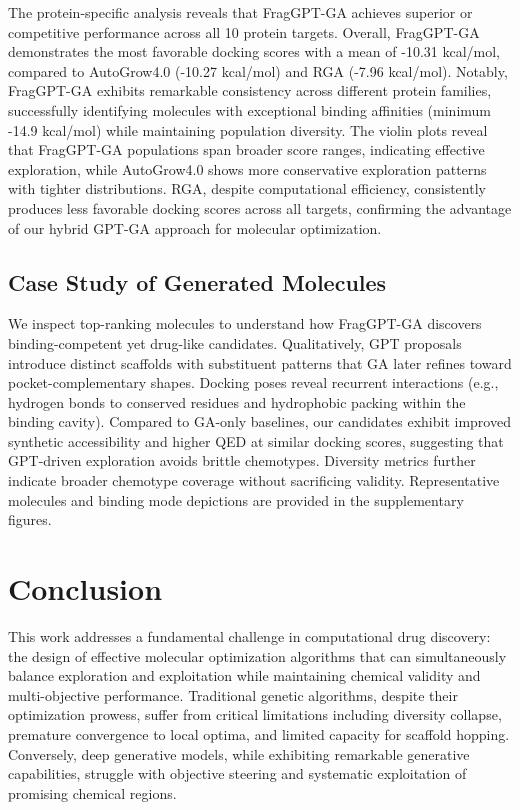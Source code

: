 \documentclass[lettersize,journal]{IEEEtran}
\begin{document}
The protein-specific analysis reveals that FragGPT-GA achieves superior or competitive performance across all 10 protein targets. Overall, FragGPT-GA demonstrates the most favorable docking scores with a mean of -10.31 kcal/mol, compared to AutoGrow4.0 (-10.27 kcal/mol) and RGA (-7.96 kcal/mol). Notably, FragGPT-GA exhibits remarkable consistency across different protein families, successfully identifying molecules with exceptional binding affinities (minimum -14.9 kcal/mol) while maintaining population diversity. The violin plots reveal that FragGPT-GA populations span broader score ranges, indicating effective exploration, while AutoGrow4.0 shows more conservative exploration patterns with tighter distributions. RGA, despite computational efficiency, consistently produces less favorable docking scores across all targets, confirming the advantage of our hybrid GPT-GA approach for molecular optimization.

\subsection{Case Study of Generated Molecules}
We inspect top-ranking molecules to understand how FragGPT-GA discovers binding-competent yet drug-like candidates. Qualitatively, GPT proposals introduce distinct scaffolds with substituent patterns that GA later refines toward pocket-complementary shapes. Docking poses reveal recurrent interactions (e.g., hydrogen bonds to conserved residues and hydrophobic packing within the binding cavity). Compared to GA-only baselines, our candidates exhibit improved synthetic accessibility and higher QED at similar docking scores, suggesting that GPT-driven exploration avoids brittle chemotypes. Diversity metrics further indicate broader chemotype coverage without sacrificing validity. Representative molecules and binding mode depictions are provided in the supplementary figures.

\section{Conclusion}

This work addresses a fundamental challenge in computational drug discovery: the design of effective molecular optimization algorithms that can simultaneously balance exploration and exploitation while maintaining chemical validity and multi-objective performance. Traditional genetic algorithms, despite their optimization prowess, suffer from critical limitations including diversity collapse, premature convergence to local optima, and limited capacity for scaffold hopping. Conversely, deep generative models, while exhibiting remarkable generative capabilities, struggle with objective steering and systematic exploitation of promising chemical regions.
\end{document}
